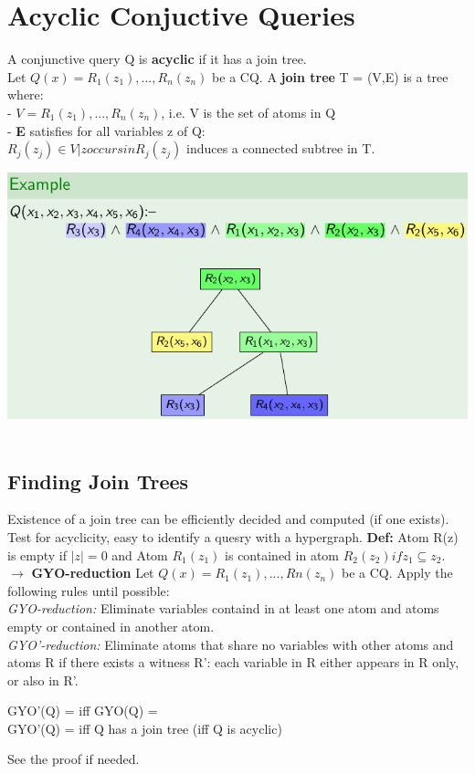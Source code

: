 \documentclass{article}
\begin{document}
\section{Acyclic Conjuctive Queries}
\begin{center}
    A conjunctive query Q is \textbf{acyclic} if it has a join tree.\\
    Let $Q(x) = R_1(z_1),...,R_n(z_n)$ be a CQ. A \textbf{join tree} T = (V,E) is a tree where:\\
    - $V = {R_1(z_1),...,R_n(z_n)}$, i.e. V is the set of atoms in Q \\
    - \textbf{E} satisfies for all variables z of Q:\\
    ${R_j(z_j) \in V|z occurs in R_j(z_j)}$ induces a connected subtree in T.
\end{center}
\includegraphics[scale=0.4]{73.png}\\\\
 \subsection{Finding Join Trees}
Existence of a join tree can be efficiently decided and computed (if one exists). Test for acyclicity, easy to identify a quesry with a hypergraph. \textbf{Def: }Atom R(z) is empty if $|z|=0$ and Atom $R_1(z_1)$ is contained in atom $R_2(z_2) if z_1 \subseteq z_2$.\\
$\longrightarrow$ \textbf{GYO-reduction}
Let $Q(x) = R_1(z_1),...,Rn(z_n)$ be a CQ. Apply the following rules until possible:\\
\textit{GYO-reduction: }Eliminate variables containd in at least one atom and atoms empty or contained in another atom.\\
\textit{GYO'-reduction: }Eliminate atoms that share no variables with other atoms and atoms R if there exists a witness R': each variable in R either appears in R only, or also in R'.\\
\begin{center}
GYO'(Q) = \empty iff GYO(Q) = \empty\\
GYO’(Q) = \empty iff Q has a join tree (iff Q is acyclic)
\end{center}
\begin{center}
    See the proof if needed.
\end{center}
\end{document}
